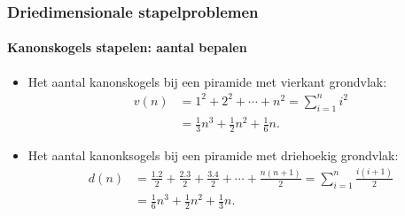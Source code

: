 \begin{frame}
\frametitle{Driedimensionale stapelproblemen}
\framesubtitle{Kanonskogels stapelen: aantal bepalen}

\begin{itemize}
	\item Het aantal kanonskogels bij een piramide met vierkant grondvlak: \begin{align*} v(n)&= 1^2 + 2^2 + \cdots + n^2= \sum_{i=1}^{n}i^2\\ &= \frac{1}{3}n^3+\frac{1}{2}n^2+\frac{1}{6}n .\end{align*}
	\item Het aantal kanonksogels bij een piramide met driehoekig grondvlak: \begin{align*} d(n) &= \frac{1.2}{2} + \frac{2.3}{2}+\frac{3.4}{2} + \cdots + \frac{n(n+1)}{2}=\sum_{i=1}^{n}\frac{i(i+1)}{2}\\ 
&=\frac{1}{6}n^3 + \frac{1}{2}n^2+\frac{1}{3}n.
\end{align*}
\end{itemize}

\end{frame}

